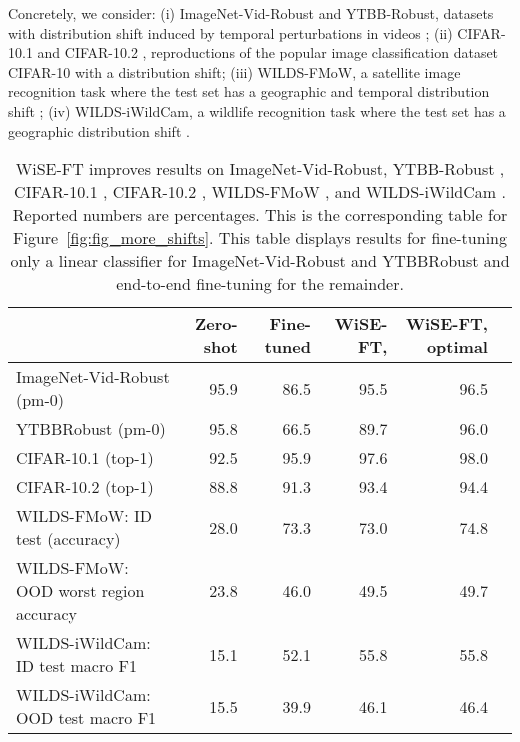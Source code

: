Concretely, we consider: (i) ImageNet-Vid-Robust and YTBB-Robust, datasets with distribution shift induced by temporal perturbations in videos \cite{vidrobust};
(ii) CIFAR-10.1 \cite{pmlr-v97-recht19a} and CIFAR-10.2 \cite{lu2020harder}, reproductions of the popular image classification dataset CIFAR-10 \cite{krizhevsky2009learning} with a distribution shift;
(iii) WILDS-FMoW, a satellite image recognition task where the test set has a geographic and temporal distribution shift \cite{wilds2021, christie2018functional};
(iv) WILDS-iWildCam, a wildlife recognition task where the test set has a geographic distribution shift \cite{wilds2021, beery2021iwildcam}.






\begin{table*}
\setlength\tabcolsep{5pt}
\small
\begin{center}

\begin{tabular}{lrrrrr}
\toprule

{} &  Zero-shot &  Fine-tuned &  WiSE-FT,  &  WiSE-FT, optimal \\
\midrule
ImageNet-Vid-Robust  (pm-0)           &       95.9 &        86.5 &                  95.5 &               96.5 \\
YTBBRobust (pm-0)                   &       95.8 &        66.5 &                  89.7 &  96.0 \\
CIFAR-10.1 (top-1) &       92.5 &        95.9 &                  97.6 &               98.0 \\
CIFAR-10.2 (top-1) &       88.8 &        91.3 &                  93.4 &                   94.4 \\
WILDS-FMoW: ID test (accuracy)                &       28.0 &        73.3 &                  73.0 &           74.8 \\
WILDS-FMoW: OOD worst region accuracy       &       23.8 &        46.0 &                  49.5 &                49.7 \\
WILDS-iWildCam: ID test macro F1       &       15.1 &        52.1 &                  55.8 & 55.8 \\
WILDS-iWildCam: OOD test macro F1     &       15.5 &        39.9 &                  46.1 &                 46.4 \\
\bottomrule
\end{tabular}
\caption{\label{tab:moreshifts}
WiSE-FT improves results on ImageNet-Vid-Robust, YTBB-Robust \cite{vidrobust}, CIFAR-10.1 \cite{pmlr-v97-recht19a}, CIFAR-10.2 \cite{lu2020harder}, WILDS-FMoW \cite{wilds2021, christie2018functional}, and WILDS-iWildCam \cite{wilds2021, beery2021iwildcam}. Reported numbers are percentages. This is the corresponding table for Figure~\ref{fig:fig_more_shifts}. This table displays results for fine-tuning only a linear classifier for ImageNet-Vid-Robust and YTBBRobust and end-to-end fine-tuning for the remainder. }
\end{center}
\end{table*}


